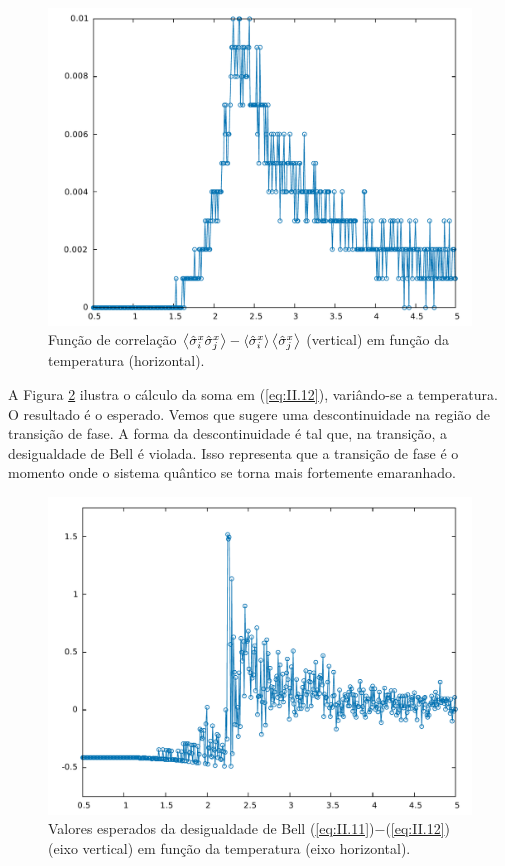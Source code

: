 \begin{figure}[h]
	\center
	\includegraphics[scale=.3]{CorrSx.pdf}
	\caption{Função de correlação $\ev{\sx_i \sx_j} - \ev{\sx_i} \ev{\sx_j}$ (vertical) em função da temperatura (horizontal).}
	\label{fig:II.6}
\end{figure}



A Figura \ref{fig:II.7} ilustra o cálculo da soma em (\ref{eq:II.12}), variândo-se a temperatura. O resultado é o esperado. Vemos que sugere uma descontinuidade na região de transição de fase. A forma da descontinuidade é tal que, na transição, a desigualdade de Bell é violada. Isso representa que a transição de fase é o momento onde o sistema quântico se torna mais fortemente emaranhado. 

\begin{figure}[h]
	\center
	\includegraphics[scale=.3]{IsotropicMBell.pdf}
	\caption{Valores esperados da desigualdade de Bell  (\ref{eq:II.11})$-$(\ref{eq:II.12}) (eixo vertical) em função da temperatura (eixo horizontal).}
	\label{fig:II.7}
\end{figure}



